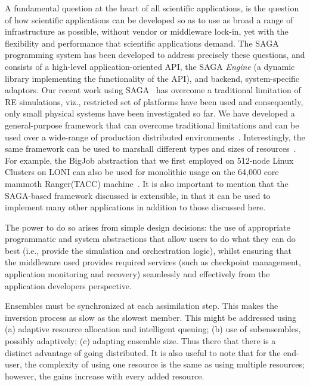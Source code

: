\documentclass{rspublic}
\begin{document}
A fundamental question at the heart of all scientific applications, is
the question of how scientific applications can be developed so as to
use as broad a range of infrastructure as possible, without vendor or
middleware lock-in, yet with the flexibility and performance that
scientific applications demand. The SAGA programming system has been
developed to address precisely these questions, and consists of a
high-level application-oriented API, the SAGA {\it Engine} (a dynamic
library implementing the functionality of the API), and backend,
system-specific adaptors.  Our recent work using
SAGA~\cite{saga-papers} has overcome a traditional limitation of RE
simulations, viz., restricted set of platforms have been used and
consequently, only small physical systems have been investigated so
far. We have developed a general-purpose framework that can overcome
traditional limitations and can be used over a wide-range of
production distributed environments~\cite{saga-royalsoc}.
Interestingly, the same framework can be used to marshall different
types and sizes of resources~\cite{saga-papers}. For example, the
BigJob abstraction that we first employed on 512-node Linux Clusters
on LONI can also be used for monolithic usage on the 64,000 core
mammoth Ranger(TACC) machine~\cite{saga-iccs09}.  It is also important
to mention that the SAGA-based framework discussed is extensible, in
that it can be used to implement many other applications in addition
to those discussed here.

The power to do so arises from simple design decisions: the use of
appropriate programmatic and system abstractions that allow users to
do what they can do best (i.e., provide the simulation and
orchestration logic), whilst ensuring that the middleware used
provides required services (such as checkpoint management, application
monitoring and recovery) seamlessly and effectively from the
application developers perspective. 

Ensembles must be synchronized at each assimilation step. This makes
the inversion process as slow as the slowest member. This might be
addressed using (a) adaptive resource allocation and intelligent
queuing; (b) use of subensembles, possibly adaptively; (c) adapting
ensemble size.  Thus there that there is a distinct advantage of going
distributed.  It is also useful to note that for the end-user, the
complexity of using one resource is the same as using multiple
resources; however, the gains increase with every added resource.
\end{document}
